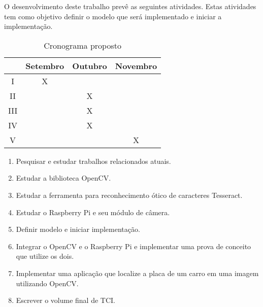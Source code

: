 O desenvolvimento deste trabalho prevê as seguintes atividades.
Estas atividades tem como objetivo definir o modelo que será implementado
e iniciar a implementação.

\begin{table}[H]
\centering
\label{tab:crono}
\begin{tabular}{c|c|c|c}
    & Setembro & Outubro & Novembro \\ \hline
I   & X        &         &          \\
II  &          & X       &          \\
III &          & X       &          \\
IV  &          & X       &          \\
V   &          &         & X       
\end{tabular}
\caption{Cronograma proposto}
\end{table}

\begin{enumerate}[I]
	\item Pesquisar e estudar trabalhos relacionados atuais.
	\item Estudar a biblioteca OpenCV\@.
	\item Estudar a ferramenta para reconhecimento ótico de caracteres Tesseract.
	\item Estudar o Raspberry Pi e seu módulo de câmera.
	\item Definir modelo e iniciar implementação.
	\item Integrar o OpenCV e o Raspberry Pi e implementar uma prova de conceito que utilize os dois.
	\item Implementar uma aplicação que localize a placa de um carro em uma imagem utilizando OpenCV.
	\item Escrever o volume final de TCI.
\end{enumerate}

